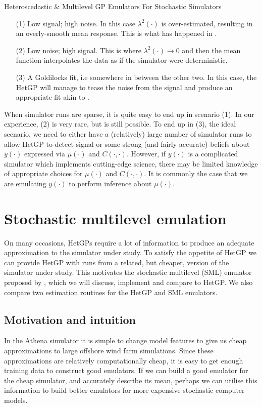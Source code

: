 \begin{chapter}{Heteroscedastic \& Multilevel GP Emulators For Stochastic Simulators\label{Ch:Hetsml}}
\begin{itemize}
	\item[(1)] Low signal; high noise. In this case $\lambda^2(\cdot)$ is over-estimated, resulting in an overly-smooth mean response. This is what has happened in .
	\item[(2)] Low noise; high signal. This is where $\lambda^2(\cdot) \to 0$ and then the mean function interpolates the data as if the simulator were deterministic.
	\item[(3)] A Goldilocks fit, i.e somewhere in between the other two. In this case, the HetGP will manage to tease the noise from the signal and produce an appropriate fit akin to .
\end{itemize}
When simulator runs are sparse, it is quite easy to end up in scenario (1). In our experience, (2) is very rare, but is still possible. To end up in (3), the ideal scenario, we need to either have a (relatively) large number of simulator runs to allow HetGP to detect signal or some strong (and fairly accurate) beliefs about $y(\cdot)$ expressed via $\mu(\cdot)$  and $C(\cdot, \cdot)$. However, if $y(\cdot)$ is a complicated simulator which implements cutting-edge science, there may be limited knowledge of appropriate choices for $\mu(\cdot)$  and $C(\cdot, \cdot)$. It is commonly the case that we are emulating $y(\cdot)$ to perform inference about $\mu(\cdot)$.

\section{Stochastic multilevel emulation}
\label{sec:SML}
On many occasions, HetGPs require a lot of information to produce an adequate approximation to the simulator under study. To satisfy the appetite of HetGP we can provide HetGP with runs from a related, but cheaper, version of the simulator under study. This motivates the stochastic multilevel (SML) emulator proposed by \citet{Kennedy2020}, which we will discuss, implement and compare to HetGP. We also compare two estimation routines for the HetGP and SML emulators.

\subsection{Motivation and intuition}

In the Athena simulator it is simple to change model features to give us cheap approximations to large offshore wind farm simulations. Since these approximations are relatively computationally cheap, it is easy to get enough training data to construct good emulators. If we can build a good emulator for the cheap simulator, and accurately describe its mean, perhaps we can utilise this information to build better emulators for more expensive stochastic computer models.


\end{chapter}
